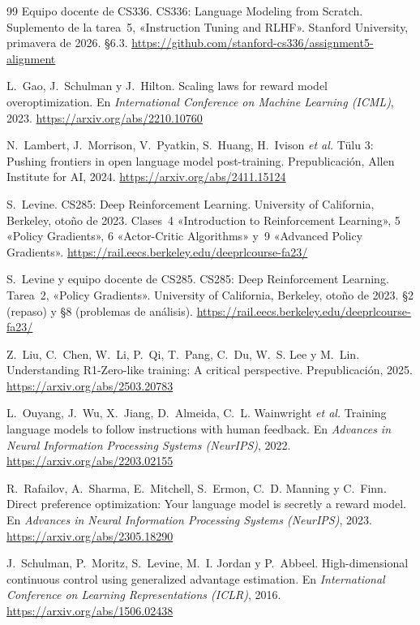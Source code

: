 \begin{thebibliography}{99}
Equipo docente de CS336.
\newblock CS336: Language Modeling from Scratch. Suplemento de la tarea~5, «Instruction Tuning and RLHF».
\newblock Stanford University, primavera de 2026. §6.3.
\newblock \url{https://github.com/stanford-cs336/assignment5-alignment}

L.~Gao, J.~Schulman y J.~Hilton.
\newblock Scaling laws for reward model overoptimization.
\newblock En \emph{International Conference on Machine Learning (ICML)}, 2023.
\newblock \url{https://arxiv.org/abs/2210.10760}

N.~Lambert, J.~Morrison, V.~Pyatkin, S.~Huang, H.~Ivison \emph{et al.}
\newblock Tülu 3: Pushing frontiers in open language model post-training.
\newblock Prepublicación, Allen Institute for AI, 2024.
\newblock \url{https://arxiv.org/abs/2411.15124}

S.~Levine.
\newblock CS285: Deep Reinforcement Learning.
\newblock University of California, Berkeley, otoño de 2023. Clases~4 «Introduction to Reinforcement Learning», 5 «Policy Gradients», 6 «Actor-Critic Algorithms» y~9 «Advanced Policy Gradients».
\newblock \url{https://rail.eecs.berkeley.edu/deeprlcourse-fa23/}

S.~Levine y equipo docente de CS285.
\newblock CS285: Deep Reinforcement Learning. Tarea~2, «Policy Gradients».
\newblock University of California, Berkeley, otoño de 2023. §2 (repaso) y §8 (problemas de análisis).
\newblock \url{https://rail.eecs.berkeley.edu/deeprlcourse-fa23/}

Z.~Liu, C.~Chen, W.~Li, P.~Qi, T.~Pang, C.~Du, W.~S. Lee y M.~Lin.
\newblock Understanding R1-Zero-like training: A critical perspective.
\newblock Prepublicación, 2025.
\newblock \url{https://arxiv.org/abs/2503.20783}

L.~Ouyang, J.~Wu, X.~Jiang, D.~Almeida, C.~L. Wainwright \emph{et al.}
\newblock Training language models to follow instructions with human feedback.
\newblock En \emph{Advances in Neural Information Processing Systems (NeurIPS)}, 2022.
\newblock \url{https://arxiv.org/abs/2203.02155}

R.~Rafailov, A.~Sharma, E.~Mitchell, S.~Ermon, C.~D. Manning y C.~Finn.
\newblock Direct preference optimization: Your language model is secretly a reward model.
\newblock En \emph{Advances in Neural Information Processing Systems (NeurIPS)}, 2023.
\newblock \url{https://arxiv.org/abs/2305.18290}

J.~Schulman, P.~Moritz, S.~Levine, M.~I. Jordan y P.~Abbeel.
\newblock High-dimensional continuous control using generalized advantage estimation.
\newblock En \emph{International Conference on Learning Representations (ICLR)}, 2016.
\newblock \url{https://arxiv.org/abs/1506.02438}


\end{thebibliography}
